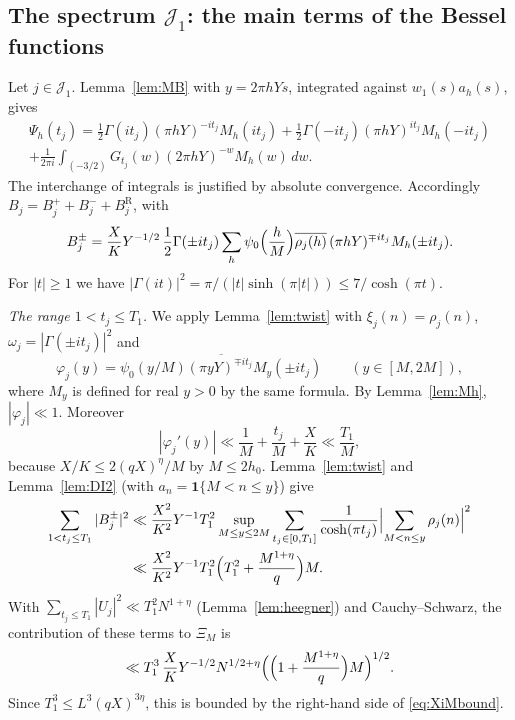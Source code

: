 \documentclass[11pt]{amsart}
\theoremstyle{remark}
\theoremstyle{definition}
\numberwithin{equation}{section}
\newcommand{\Jc}{\mathcal{J}}
\newcommand{\one}{\mathbf{1}}
\begin{document}
\subsection{\texorpdfstring{The spectrum $\Jc_1$: the main terms of the Bessel functions}{The spectrum J\_1: the main terms of the Bessel functions}}\label{sec:J1main}
Let $j\in\Jc_1$. Lemma~\ref{lem:MB} with $y=2\pi hYs$, integrated against $w_1(s)a_h(s)$, gives
\begin{multline*}
\Psi_h(t_j)=\frac12\Gamma(it_j)(\pi hY)^{-it_j}M_h(it_j)+\frac12\Gamma(-it_j)(\pi hY)^{it_j}M_h(-it_j)\\
+\frac1{2\pi i}\int_{(-3/2)}G_{t_j}(w)(2\pi hY)^{-w}M_h(w)\,dw.
\end{multline*}
The interchange of integrals is justified by absolute convergence. Accordingly $B_j=B_j^++B_j^-+B_j^{\mathrm R}$, with
\[
B_j^\pm=\frac XKY^{-1/2}\,\frac12\Gamma(\pm it_j)\sum_h\psi_0\Bigl(\frac hM\Bigr)\overline{\rho_j(h)}\,(\pi hY)^{\mp it_j}M_h(\pm it_j).
\]
For $|t|\ge1$ we have $|\Gamma(it)|^2=\pi/(|t|\sinh(\pi|t|))\le7/\cosh(\pi t)$.

\emph{The range $1<t_j\le T_1$.} We apply Lemma~\ref{lem:twist} with $\xi_j(n)=\rho_j(n)$, $\omega_j=|\Gamma(\pm it_j)|^2$ and
\[
\varphi_j(y)=\overline{\psi_0(y/M)(\pi yY)^{\mp it_j}M_y(\pm it_j)}\qquad(y\in[M,2M]),
\]
where $M_y$ is defined for real $y>0$ by the same formula. By Lemma~\ref{lem:Mh}, $|\varphi_j|\ll1$. Moreover
\[
|\varphi_j'(y)|\ll\frac1M+\frac{t_j}{M}+\frac XK\ll\frac{T_1}{M},
\]
because $X/K\le2(qX)^\eta/M$ by $M\le2h_0$. Lemma~\ref{lem:twist} and Lemma~\ref{lem:DI2} (with $a_n=\one\{M<n\le y\}$) give
\begin{align*}
\sum_{1<t_j\le T_1}|B_j^\pm|^2&\ll\frac{X^2}{K^2}Y^{-1}T_1^2\sup_{M\le y\le2M}\sum_{t_j\in[0,T_1]}\frac{1}{\cosh(\pi t_j)}\Bigl|\sum_{M<n\le y}\rho_j(n)\Bigr|^2\\
&\ll\frac{X^2}{K^2}Y^{-1}T_1^2\Bigl(T_1^2+\frac{M^{1+\eta}}q\Bigr)M.
\end{align*}
With $\sum_{t_j\le T_1}|U_j|^2\ll T_1^2N^{1+\eta}$ (Lemma~\ref{lem:heegner}) and Cauchy--Schwarz, the contribution of these terms to $\Xi_M$ is
\[
\ll T_1^3\,\frac XKY^{-1/2}N^{1/2+\eta}\Bigl(\Bigl(1+\frac{M^{1+\eta}}q\Bigr)M\Bigr)^{1/2}.
\]
Since $T_1^3\le L^3(qX)^{3\eta}$, this is bounded by the right-hand side of \eqref{eq:XiMbound}.
\end{document}
